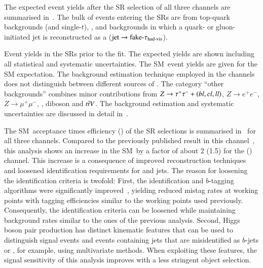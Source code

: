 The expected event yields after the SR selection of all three channels are
summarised in~. The bulk of events entering the SRs
are from top-quark backgrounds (\ttbar and single-$t$), \Zjets, and backgrounds
in which a quark- or gluon-initiated jet is reconstructed as a \tauhadvis
($\text{jet} \to \text{fake-}\tau_{\text{had-vis}}$).


\begin{table}[htbp]
  \centering

  \caption[Event yields in the SRs prior to the fit.]{Event yields in the SRs
    prior to the fit. The expected yields are shown including all statistical
    and systematic uncertainties. The SM~\HH event yields are given for the SM
    expectation. The \faketauhadvis background estimation technique employed in
    the \lephad channels does not distinguish between different sources of
    \faketauhadvis. The category ``other backgrounds'' combines minor
    contributions from $Z \to \tau^{+} \tau^{-} + (bl,cl,ll)$, $Z \to e^{+}e^{-}$,
    $Z \to \mu^{+}\mu^{-}$, \Wjets, diboson and $t\bar{t} V$. The background
    estimation and systematic uncertainties are discussed in detail
    in~.}%
  \label{tab:smhh_prefit_yields}%
  \label{tab:hadhad_presel_yields}

  \resizebox{\textwidth}{!}{
    
  }
\end{table}

The SM~\HH acceptance times efficiency (\AccTimesEff) of the SR selections is
summarised in~ for all three channels. Compared
to the previously published result in this
channel~\cite{HIGG-2016-16-witherratum}, this analysis shows an increase in the
SM~\HH \AccTimesEff by a factor of about 2 (1.5) for the \hadhad (\lephad)
channel. This increase is a consequence of improved \tauhadvis reconstruction
techniques and loosened identification requirements for \tauhadvis and \btagged
jets.
The reason for loosening the identification criteria is twofold: First, the
\tauhadvis identification and $b$-tagging algorithms were significantly
improved~\cite{ATL-PHYS-PUB-2019-033,FTAG-2019-07}, yielding reduced mistag
rates at working points with tagging efficiencies similar to the working points
used previously. Consequently, the identification criteria can be loosened while
maintaining background rates similar to the ones of the previous analysis.
Second, Higgs boson pair production has distinct kinematic features that can be
used to distinguish signal events and events containing jets that are
misidentified as $b$-jets or \tauhadvis, for example, using multivariate
methods. When exploiting these features, the signal sensitivity of this analysis
improves with a less stringent object selection.

